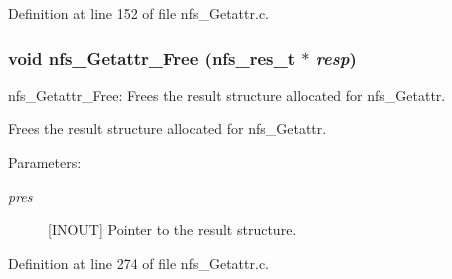Definition at line 152 of file nfs\_\-Getattr.c.
\subsubsection[{nfs\_\-Getattr\_\-Free}]{\setlength{\rightskip}{0pt plus 5cm}void nfs\_\-Getattr\_\-Free (nfs\_\-res\_\-t $\ast$ {\em resp})}\label{nfs__Getattr_8c_3faa8c359341697ec064df525e047beb}


nfs\_\-Getattr\_\-Free: Frees the result structure allocated for nfs\_\-Getattr.

Frees the result structure allocated for nfs\_\-Getattr.

\begin{Desc}
\item[Parameters:]
\begin{description}
\item[{\em pres}][INOUT] Pointer to the result structure. \end{description}
\end{Desc}


Definition at line 274 of file nfs\_\-Getattr.c.